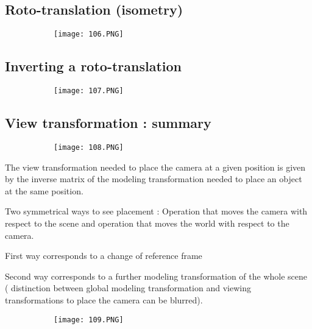 \documentclass{article}
\begin{document}
\subsection{Roto-translation (isometry)}
\vspace{31mm}
\begin{figure}[ht!]
  \centering
  \begin{subfigure}[b]{0.3\linewidth}
    \texttt{[image: 106.PNG]}
  \end{subfigure}
\end{figure}

\subsection{Inverting a roto-translation}

\begin{figure}[ht!]
  \centering
  \begin{subfigure}[b]{0.4\linewidth}
    \texttt{[image: 107.PNG]}
  \end{subfigure}
\end{figure}

\subsection{View transformation : summary}


\begin{figure}[ht!]
  \centering
  \begin{subfigure}[b]{0.4\linewidth}
    \texttt{[image: 108.PNG]}
  \end{subfigure}
\end{figure}

The view transformation needed to place the camera at a given position is given by the inverse matrix of the modeling transformation needed to place an object at the same position.

Two symmetrical ways to see placement : Operation that moves the camera with respect to the scene and operation that moves the world with respect to the camera.

First way corresponds to a change of reference frame

Second way corresponds to a further modeling transformation of the whole scene ( distinction between global modeling transformation and viewing transformations to place the camera can be blurred).

\begin{figure}[ht!]
  \centering
  \begin{subfigure}[b]{0.9\linewidth}
    \texttt{[image: 109.PNG]}
  \end{subfigure}
\end{figure}
\end{document}
